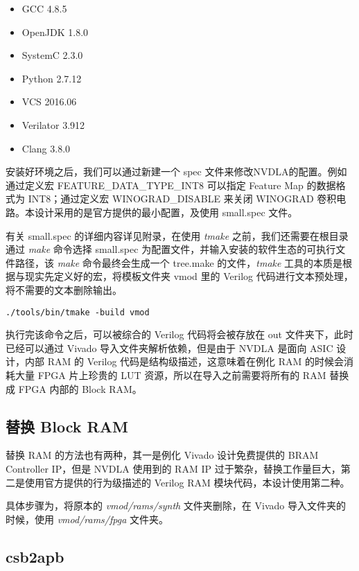 \begin{itemize}
    \item GCC 4.8.5
    \item OpenJDK 1.8.0
    \item SystemC 2.3.0
    \item Python 2.7.12
    \item VCS 2016.06
    \item Verilator 3.912
    \item Clang 3.8.0
\end{itemize}

安装好环境之后，我们可以通过新建一个 spec 文件来修改NVDLA的配置。例如通过定义宏 FEATURE\_DATA\_TYPE\_INT8 可以指定 Feature Map 的数据格式为 INT8；通过定义宏 WINOGRAD\_DISABLE 来关闭 WINOGRAD 卷积电路。本设计采用的是官方提供的最小配置，及使用 small.spec 文件。

有关 small.spec 的详细内容详见附录，在使用 \emph{tmake} 之前，我们还需要在根目录通过 \emph{make} 命令选择 small.spec 为配置文件，并输入安装的软件生态的可执行文件路径，该 \emph{make} 命令最终会生成一个 tree.make 的文件，\emph{tmake} 工具的本质是根据与现实先定义好的宏，将模板文件夹 vmod 里的 Verilog 代码进行文本预处理，将不需要的文本删除输出。

\lstset{language=Bash}
\begin{lstlisting}
./tools/bin/tmake -build vmod
\end{lstlisting}

执行完该命令之后，可以被综合的 Verilog 代码将会被存放在 out 文件夹下，此时已经可以通过 Vivado 导入文件夹解析依赖，但是由于 NVDLA 是面向 ASIC 设计，内部 RAM 的 Verilog 代码是结构级描述，这意味着在例化 RAM 的时候会消耗大量 FPGA 片上珍贵的 LUT 资源，所以在导入之前需要将所有的 RAM 替换成 FPGA 内部的 Block RAM。

\subsection{替换 Block RAM}

替换 RAM 的方法也有两种，其一是例化 Vivado 设计免费提供的 BRAM Controller IP，但是 NVDLA 使用到的 RAM IP 过于繁杂，替换工作量巨大，第二是使用官方提供的行为级描述的 Verilog RAM 模块代码，本设计使用第二种。

具体步骤为，将原本的 \emph{vmod/rams/synth} 文件夹删除，在 Vivado 导入文件夹的时候，使用 \emph{vmod/rams/fpga} 文件夹。

\subsection{csb2apb}

